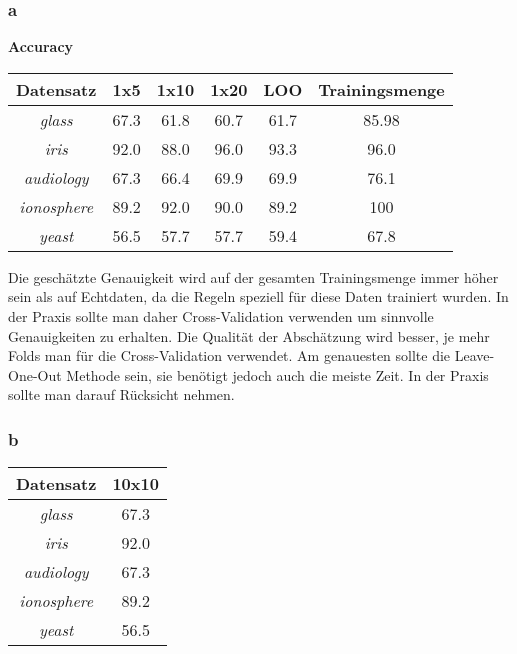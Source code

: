 \subsubsection*{a}
\textbf{Accuracy}
\begin{table}[htb]
	\centering
\begin{tabular}{c|c|c|c|c|c}
				Datensatz         & 1x5  & 1x10 & 1x20 & LOO  & Trainingsmenge   \\ \hline
				\emph{glass}      & 67.3 & 61.8 & 60.7 & 61.7 & 85.98   \\ \hline
				\emph{iris}       & 92.0 & 88.0 & 96.0 & 93.3 & 96.0    \\ \hline
				\emph{audiology}  & 67.3 & 66.4 & 69.9 & 69.9 & 76.1    \\ \hline
				\emph{ionosphere} & 89.2 & 92.0 & 90.0 & 89.2 & 100   \\ \hline
				\emph{yeast}      & 56.5 & 57.7 & 57.7 & 59.4 & 67.8   \\ 
\end{tabular}
\end{table}

Die gesch\"atzte Genauigkeit wird auf der gesamten Trainingsmenge immer h\"oher sein als auf Echtdaten, da die Regeln speziell f\"ur diese Daten trainiert wurden. In der Praxis sollte man daher Cross-Validation verwenden um sinnvolle Genauigkeiten zu erhalten. Die Qualit\"at der Absch\"atzung wird besser, je mehr Folds man f\"ur die Cross-Validation verwendet. Am genauesten sollte die Leave-One-Out Methode sein, sie ben\"otigt jedoch auch die meiste Zeit. In der Praxis sollte man darauf R\"ucksicht nehmen.

\subsubsection*{b}
\begin{table}[htb]
	\centering
\begin{tabular}{c|c}
				Datensatz         & 10x10    \\ \hline
				\emph{glass}      & 67.3     \\ \hline
				\emph{iris}       & 92.0     \\ \hline
				\emph{audiology}  & 67.3     \\ \hline
				\emph{ionosphere} & 89.2     \\ \hline
				\emph{yeast}      & 56.5     \\ 
\end{tabular}
\end{table}

